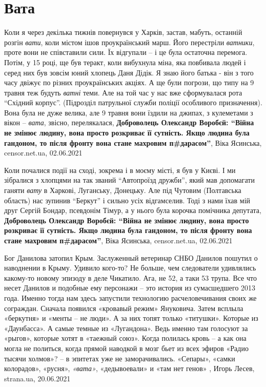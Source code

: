  
 
 
 
 
\chapter{Вата}
\label{sec:slova.vata}

Коли я через декілька тижнів повернувся у Харків, застав, мабуть, останній
розгін \emph{вати}, коли містом ішов проукраїнський марш. Його перестріли \emph{ватники},
проте вони не співставили сили. Їх відгупали – і це була остаточна перемога.
Потім, у 15 році, ще був теракт, коли вибухнула міна, яка повбивала людей і
серед них був зовсім юний хлопець Даня Дідік. Я знаю його батька - він з того
часу двіжує по різних проукраїнських акціях. А ще були погрози, що типу на 9
травня теж будуть \emph{ватні} теми. Але на той час у нас вже сформувалася рота
\enquote{Східний корпус}. (Підрозділ патрульної служби поліції особливого призначення).
Вона була не дуже велика, але 9 травня вони їздили на джипах, з кулеметами з
вікон – \emph{вата}, звісно, перелякалася, 
\textbf{Доброволець Олександр Воробєй: \enquote{Війна не змінює людину, вона
просто розкриває її сутність. Якщо людина була гандоном, то після фронту вона
стане махровим п\#дарасом}},
Віка Ясинська, censor.net.ua, 02.06.2021

Коли почалися події на сході, зокрема і в моєму місті, я був у Києві. І ми
зібралися з хлопцями на так званий \enquote{Автопроїзд дружби}, який мав допомагати
ганяти \emph{вату} в Харкові, Луганську, Донецьку. Але під Чутовим (Полтавська
область) нас зупинив \enquote{Беркут} і сильно усіх відгамселив. Тоді з нами їхав мій
друг Сергій Бондар, псевдонім Тімур, а у нього була корочка помічника депутата,
\textbf{Доброволець Олександр Воробєй: \enquote{Війна не змінює людину, вона
просто розкриває її сутність. Якщо людина була гандоном, то після фронту вона
стане махровим п\#дарасом}},
Віка Ясинська, censor.net.ua, 02.06.2021

Бог Данилова затопил Крым. Заслуженный ветеринар СНБО Данилов пошутил о
наводнении в Крыму. Удивило кого-то? Не больше, чем следователи удивлялись
какому-то новому эпизоду в деле Чикатило. Ага, не 52, а таки 53 трупа.  Все что
несет Данилов и подобные ему персонажи – это история из сумасшедшего 2013 года.
Именно тогда нам здесь запустили технологию расчеловечивания своих же
сограждан. Сначала появился «кровавый режим» Януковича. Затем всплыла
«беркутня» и «менты – не люди». А за них топят только «титушки». Которые из
«Даунбасса». А самые темные из «Лугандона». Ведь именно там голосуют за
«рыгов», которые хотят в «таежный союз».  Когда полилась кровь – а как она
могла не политься, когда прямой наводкой в мозг бьет из всех эфиров «Радио
тысячи холмов»? – в эпитетах уже не заморачивались. «Сепары», «самки
колорадов», «русня», \emph{«вата»}, «дедывоевали» и «там нет генов»
, 
Игорь Лесев, strana.ua, 20.06.2021

